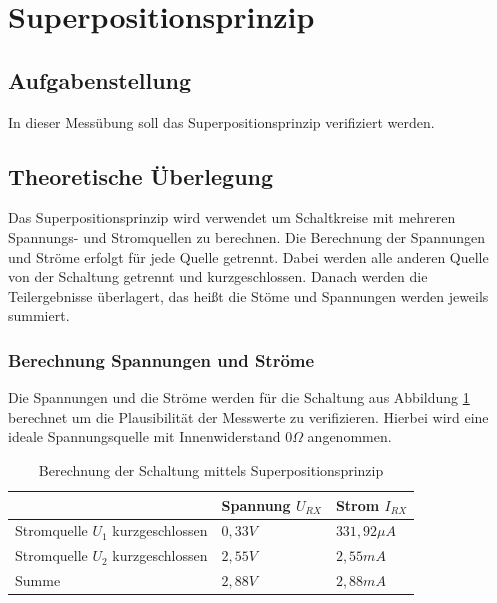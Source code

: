 \documentclass[12pt,a4paper,titlepage]{article}
\begin{document}
\newpage
\section{Superpositionsprinzip}
\subsection{Aufgabenstellung}
In dieser Mess\"ubung soll das Superpositionsprinzip verifiziert werden.

\subsection{Theoretische \"Uberlegung}
Das Superpositionsprinzip wird verwendet um Schaltkreise mit mehreren Spannungs- und Stromquellen zu berechnen. Die Berechnung der Spannungen und Str\"ome erfolgt f\"ur jede Quelle getrennt. Dabei werden alle anderen Quelle von der Schaltung getrennt und kurzgeschlossen. Danach werden die Teilergebnisse \"uberlagert, das hei\ss t die St\"ome und Spannungen werden jeweils summiert.

\subsubsection{Berechnung Spannungen und Str\"ome}
Die Spannungen und die Str\"ome werden f\"ur die Schaltung aus Abbildung \ref{Figure4.1.1} berechnet um die Plausibilit\"at der Messwerte zu verifizieren. Hierbei wird eine ideale Spannungsquelle mit Innenwiderstand $0 \Omega$ angenommen.
\begin{table}[H]
\centering
\begin{tabular}{|l|l|l|}
\hline
                                  & Spannung $U_{RX}$ & Strom $I_{RX}$     \\ \hline
Stromquelle $U_1$ kurzgeschlossen & $0,33 V$ & $331,92 \mu A$ \\ \hline
Stromquelle $U_2$ kurzgeschlossen & $2,55 V$   & $2,55 mA$   \\ \hline
Summe                             & $2,88 V$  & $2,88 mA$ \\\hline
\end{tabular}
\caption{Berechnung der Schaltung mittels Superpositionsprinzip}
\label{Figure4.1.1}
\end{table}
\end{document}
